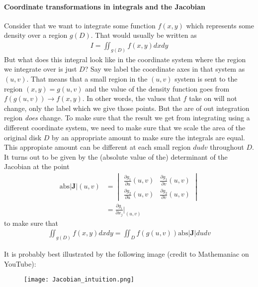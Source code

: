 \paragraph{Coordinate transformations in integrals and the Jacobian}
Consider that we want to integrate some function \(f(x,y)\) which represents some density over a region \(g(D)\). That would usually be written as \begin{align*}
    I = \iint_{g(D)} f(x, y) dx dy
\end{align*}
But what does this integral look like in the coordinate system where the region we integrate over is just \(D\)? Say we label the coordinate axes in that system as \((u, v)\). That means that a small region in the \((u, v)\) system is sent to the region \((x,y) = g(u, v)\) and the value of the density function goes from \(f(g(u, v)) \to f(x,y)\). In other words, the values that \(f\) take on will not change, only the label which we give those points. But the are of out integration region \textit{does} change. To make sure that the result we get from integrating using a different coordinate system, we need to make sure that we scale the area of the original disk \(D\) by an appropriate amount to make sure the integrals are equal. This appropiate amount can be different at each small region \(dudv\) throughout \(D\). It turns out to be given by the (absolute value of the) determinant of the Jacobian at the point
\begin{align*}
    \text{abs}|\mathbf{J}|(u, v) &= \begin{vmatrix}
        \frac{\partial g_1}{\partial u}(u, v) & \frac{\partial g_1}{\partial v}(u, v)\\
        \frac{\partial g_2}{\partial u}(u, v) & \frac{\partial g_2}{\partial v} (u, v) 
    \end{vmatrix}\\
    &= \frac{\partial g_i}{\partial x_j}\Biggr|_{(u, v)}
\end{align*}  to make sure that \begin{align*}
    \iint_{g(D)} f(x, y) dx dy = \iint_D f(g(u, v)) \text{abs}|\mathbf{J}| du dv
\end{align*}

It is probably best illustrated by the following image (credit to Mathemaniac on YouTube):
\begin{figure}[h]
    \centering
    \texttt{[image: Jacobian\_intuition.png]}
\end{figure}

